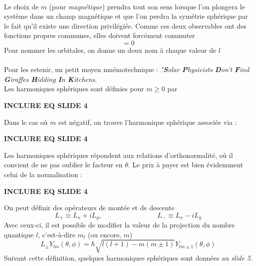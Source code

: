 \ \\

Le choix de $m$ (pour \textit{magnétique}) prendra tout son sens lorsque l'on plongera le système dans un 
champ magnétique et que l'on perdra la symétrie sphérique par le fait qu'il existe une direction privilégiée. 
Comme ces deux observables ont des fonctions propres communes, elles doivent forcément commuter
\begin{equation}
[\vec{L}^2, L_z] = 0
\end{equation}
Pour nommer les orbitales, on donne un doux nom à chaque valeur de $l$\\

\ \\

Pour les retenir, un petit moyen mnémotechnique : \textit{"\textbf{S}olar \textbf{P}hysicists \textbf{D}on't
\textbf{F}ind \textbf{G}iraffes \textbf{H}idding \textbf{I}n \textbf{K}itchens}.\\

Les harmoniques sphériques sont définies pour $m \geq 0$ par 
\begin{center}
\textbf{INCLURE EQ SLIDE 4}
\end{center}
Dans le cas où $m$ est négatif, on trouve l'harmonique sphérique associée via : 
\begin{center}
\textbf{INCLURE EQ SLIDE 4}
\end{center}
Les harmoniques sphériques répondent aux relations d'orthonormalité, où il convient de ne pas oublier le 
facteur en $\theta$. Le prix à payer est bien évidemment celui de la normalisation :
\begin{center}
\textbf{INCLURE EQ SLIDE 4}
\end{center}

On peut définir des opérateurs de montée et de descente
\begin{equation}
L_+ \equiv L_x+iL_y,\qquad\qquad\qquad\qquad L_- \equiv L_x-iL_y
\end{equation}
Avec ceux-ci, il est possible de modifier la valeur de la projection du nombre quantique $l$, c'est-à-dire
$m_l$ (ou encore, $m$)
\begin{equation}
L_\pm Y_{lm}(\theta,\phi) = \hbar\sqrt{l(l+1)-m(m\pm 1)}Y_{lm\pm1}(\theta,\phi)
\end{equation}
Suivant cette définition, quelques harmoniques sphériques sont données au \textit{slide 5}.



